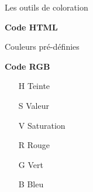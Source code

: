 \begin{frame}{Les outils de coloration}
	\begin{minipage}[t]{0.49\textwidth}
		\textbf{Code HTML}

		\vspace{0.2cm}
		Couleurs pré-définies

		\vspace{0.2cm}

		\begin{center}
		\end{center}

	\end{minipage}\hfill
	\begin{minipage}[t]{0.49\textwidth}
		\textbf{Code RGB}

		\begin{itemize}
			\item[H] Teinte
			\item[S] Valeur
			\item[V] Saturation
			\item[R] Rouge
			\item[G] Vert
			\item[B] Bleu
		\end{itemize}

	\end{minipage}
\end{frame}



